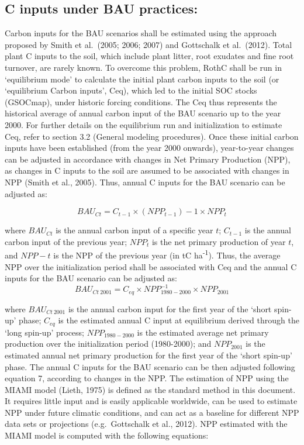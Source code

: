 \documentclass[
  10pt,
  b5paper,
]{book}
\begin{document}
\hypertarget{c-inputs-under-bau-practices}{%
\subsection{C inputs under BAU practices:}\label{c-inputs-under-bau-practices}}

Carbon inputs for the BAU scenarios shall be estimated using the approach proposed by Smith et al.~(2005; 2006; 2007) and Gottschalk et al.~(2012). Total plant C inputs to the soil, which include plant litter, root exudates and fine root turnover, are rarely known. To overcome this problem, RothC shall be run in `equilibrium mode' to calculate the initial plant carbon inputs to the soil (or `equilibrium Carbon inputs', Ceq), which led to the initial SOC stocks (GSOCmap), under historic forcing conditions. The Ceq thus represents the historical average of annual carbon input of the BAU scenario up to the year 2000. For further details on the equilibrium run and initialization to estimate Ceq, refer to section 3.2 (General modeling procedures).
Once these initial carbon inputs have been established (from the year 2000 onwards), year-to-year changes can be adjusted in accordance with changes in Net Primary Production (NPP), as changes in C inputs to the soil are assumed to be associated with changes in NPP (Smith et al., 2005). Thus, annual C inputs for the BAU scenario can be adjusted as:

\begin{equation}
\tag{6.4}
BAU_{Ct} = C_{t-1} \times (NPP_{t-1})-1 \times NPP_t
\end{equation}

where \(BAU_{Ct}\) is the annual carbon input of a specific year \(t\); \(C_{t-1}\) is the annual carbon input of the previous year; \(NPP_t\) is the net primary production of year \(t\), and \(NPP-t\) is the NPP of the previous year (in tC ha\textsuperscript{-1}). Thus, the average NPP over the initialization period shall be associated with Ceq and the annual C inputs for the BAU scenario can be adjusted as:
\begin{equation}
\tag{6.5}
BAU_{Ct \ 2001} = C_{eq} \times NPP_{1980-2000}^{-1} \times NPP_{2001}                                                 
\end{equation}

where \(BAU_{Ct \ 2001}\) is the annual carbon input for the first year of the `short spin-up' phase; \(C_{eq}\) is the estimated annual C input at equilibrium derived through the `long spin-up' process; \(NPP_{1980-2000}\) is the estimated average net primary production over the initialization period (1980-2000); and \(NPP_{2001}\) is the estimated annual net primary production for the first year of the `short spin-up' phase. The annual C inputs for the BAU scenario can be then adjusted following equation 7, according to changes in the NPP.
The estimation of NPP using the MIAMI model (Lieth, 1975) is defined as the standard method in this document. It requires little input and is easily applicable worldwide, can be used to estimate NPP under future climatic conditions, and can act as a baseline for different NPP data sets or projections (e.g.~Gottschalk et al., 2012). NPP estimated with the MIAMI model is computed with the following equations:
\end{document}
